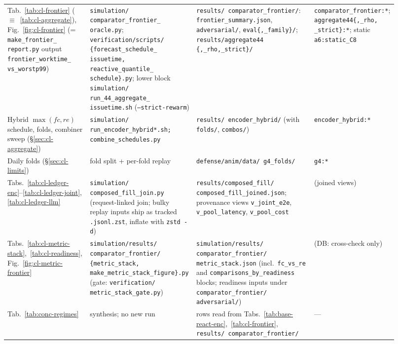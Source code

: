 {\begin{longtable}{@{}>{\raggedright\arraybackslash}p{0.215\linewidth}>{\raggedright\arraybackslash}p{0.245\linewidth}>{\raggedright\arraybackslash}p{0.30\linewidth}>{\raggedright\arraybackslash}p{0.155\linewidth}@{}}
Tab.~\ref{tab:cl-frontier} (${\equiv}$~\ref{tab:cl-aggregate}),
  Fig.~\ref{fig:cl-frontier} (= \texttt{make\_\allowbreak frontier\_\allowbreak
  report.py} output \texttt{frontier\_\allowbreak worktime\_\allowbreak
  vs\_\allowbreak worstp99}) &
  \texttt{simulation/ comparator\_frontier\_ oracle.py};
  \texttt{verification/scripts/ \{forecast\_schedule\_ issuetime,
  reactive\_quantile\_ schedule\}.py}; lower block
  \texttt{simulation/ run\_44\_aggregate\_ issuetime.sh}
  (\texttt{--strict-rewarm}) &
  \texttt{results/ comparator\_frontier/}: \texttt{frontier\_summary.json},
  \texttt{adversarial/}, \texttt{eval\{,\_family\}/};
  \texttt{results/aggregate44 \{,\_rho,\_strict\}/} &
  \texttt{comparator\_\allowbreak frontier:*};
  \texttt{aggregate44\allowbreak\{,\allowbreak\_rho, \_strict\}:*}; static
  \texttt{a6:static\_C8} \\
Hybrid $\max(fc,re)$ schedule, folds, combiner sweep
  (\S\ref{sec:cl-aggregate}) &
  \texttt{simulation/ run\_\allowbreak encoder\_\allowbreak hybrid*.sh;
  combine\_\allowbreak schedules.py} &
  \texttt{results/ encoder\_hybrid/} (with \texttt{folds/}, \texttt{combos/})
  & \texttt{encoder\_\allowbreak hybrid:*} \\
Daily folds (\S\ref{sec:cl-limits}) & fold split + per-fold replay &
  \texttt{defense/anim/data/ g4\_folds/} & \texttt{g4:*} \\
Tabs.~\ref{tab:cl-ledger-enc}--\ref{tab:cl-ledger-joint},
  \ref{tab:cl-ledger-llm} &
  \texttt{simulation/ composed\_fill\_join.py} (request-linked join; bulky
  replay inputs ship as tracked \texttt{.jsonl.zst}, inflate with
  \texttt{zstd -d}) &
  \texttt{results/composed\_fill/ composed\_fill\_joined.json}; provenance
  views \texttt{v\_joint\_e2e}, \texttt{v\_pool\_latency},
  \texttt{v\_pool\_cost} & (joined views) \\
Tabs.~\ref{tab:cl-metric-stack},~\ref{tab:cl-readiness},
  Fig.~\ref{fig:cl-metric-frontier} &
  \texttt{simulation/results/ comparator\_frontier/ \{metric\_stack,
  make\_\allowbreak metric\_\allowbreak stack\_\allowbreak figure\}.py} (gate:
  \texttt{verification/ metric\_stack\_gate.py}) &
  \texttt{simulation/results/ comparator\_frontier/ metric\_stack.json}
  (incl.\ \texttt{fc\_vs\_re} and \texttt{comparisons\_by\_readiness}
  blocks; readiness inputs under \texttt{comparator\_frontier/
  adversarial/}) & (DB: cross-check only) \\
Tab.~\ref{tab:conc-regimes} & synthesis; no new run &
  rows read from Tabs.~\ref{tab:base-react-enc},~\ref{tab:cl-frontier},
  \texttt{results/ comparator\_frontier/} & --- \\

\end{longtable}}
